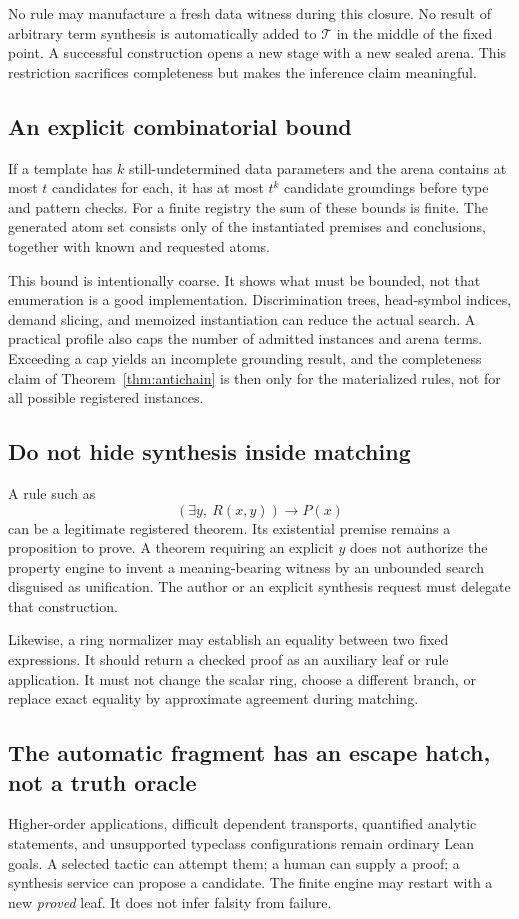 \documentclass[11pt,a4paper]{article}
\theoremstyle{plain}
\theoremstyle{definition}
\theoremstyle{remark}
\begin{document}
No rule may manufacture a fresh data witness during this closure. No result of arbitrary term synthesis is automatically added to $\mathcal T$ in the middle of the fixed point. A successful construction opens a new stage with a new sealed arena. This restriction sacrifices completeness but makes the inference claim meaningful.

\subsection{An explicit combinatorial bound}
If a template has $k$ still-undetermined data parameters and the arena contains at most $t$ candidates for each, it has at most $t^k$ candidate groundings before type and pattern checks. For a finite registry the sum of these bounds is finite. The generated atom set consists only of the instantiated premises and conclusions, together with known and requested atoms.

This bound is intentionally coarse. It shows what must be bounded, not that enumeration is a good implementation. Discrimination trees, head-symbol indices, demand slicing, and memoized instantiation can reduce the actual search. A practical profile also caps the number of admitted instances and arena terms. Exceeding a cap yields an incomplete grounding result, and the completeness claim of Theorem~\ref{thm:antichain} is then only for the materialized rules, not for all possible registered instances.

\subsection{Do not hide synthesis inside matching}
A rule such as
\[
 (\exists y,\ R(x,y))\to P(x)
\]
can be a legitimate registered theorem. Its existential premise remains a proposition to prove. A theorem requiring an explicit $y$ does not authorize the property engine to invent a meaning-bearing witness by an unbounded search disguised as unification. The author or an explicit synthesis request must delegate that construction.

Likewise, a ring normalizer may establish an equality between two fixed expressions. It should return a checked proof as an auxiliary leaf or rule application. It must not change the scalar ring, choose a different branch, or replace exact equality by approximate agreement during matching.

\subsection{The automatic fragment has an escape hatch, not a truth oracle}
Higher-order applications, difficult dependent transports, quantified analytic statements, and unsupported typeclass configurations remain ordinary Lean goals. A selected tactic can attempt them; a human can supply a proof; a synthesis service can propose a candidate. The finite engine may restart with a new \emph{proved} leaf. It does not infer falsity from failure.
\end{document}
